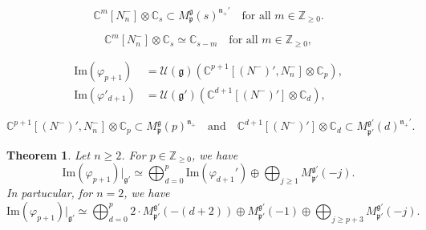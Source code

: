 \documentclass[10pt,a4paper]{amsart}
\newtheorem{thm}{Theorem}
\newcommand{\C}{\mathbb{C}}
\newcommand{\Cal}{\mathcal}
\renewcommand{\Im}{\mathrm{Im}}
\newcommand{\Mp}{M^{\fg}_{\fp}}
\newcommand{\Mpp}{M^{\fg'}_{\fp'}}
\newcommand{\Z}{\mathbb{Z}}
\newcommand{\fg}{{\mathfrak g}}
\newcommand{\fn}{{\mathfrak n}}
\newcommand{\fp}{{\mathfrak p}}
\begin{document}
\begin{equation}\label{eqn:M300}
\C^m[N_n^-] \otimes \C_s \subset \Mp(s)^{\fn_+'} 
\quad
\text{for all $m \in \Z_{\geq 0}$}.
\end{equation}

\begin{equation}\label{eqn:M30a}
\C^m[N_n^-] \otimes \C_s\simeq \C_{s-m}
\quad
\text{for all $m \in \Z_{\geq 0}$},
\end{equation}

\begin{align}
\Im(\varphi_{p+1}) &= 
\Cal{U}(\fg)\left(
\C^{p+1}[(N^-)', N_n^-] \otimes \C_p
\right), \label{eqn:M30A}\\
\Im(\varphi'_{d+1}) &= \Cal{U}(\fg')\left(
\C^{d+1}[(N^-)'] \otimes \C_d
\right),\label{eqn:M30B}
\end{align}

\begin{equation}\label{eqn:M30D}
\C^{p+1}[(N^-)', N_n^-] \otimes \C_p
\subset \Mp(p)^{\fn_+}
\quad
\text{and}
\quad
\C^{d+1}[(N^-)'] \otimes \C_d
\subset \Mpp(d)^{\fn_+'}.
\end{equation}

\begin{thm}\label{thm:GVM31b}
Let $n\geq 2$. For $p \in \Z_{\geq 0}$, we have 
\begin{equation}\label{eqn:GVM31A}
\Im(\varphi_{p+1})\vert_{\fg'} \simeq 
\bigoplus_{d=0}^p \Im (\varphi_{d+1}') \oplus \bigoplus_{j \geq 1} \Mpp(-j).
\end{equation}
In partucular, for $n=2$, we have 
\begin{equation}\label{eqn:GVM31B}
\Im(\varphi_{p+1})\vert_{\fg'} \simeq 
\bigoplus_{d=0}^p 2 \cdot \Mpp(-(d+2)) \oplus \Mpp(-1) \oplus 
\bigoplus_{j\geq p+3} \Mpp(-j).
\end{equation}
\end{thm}
\end{document}

